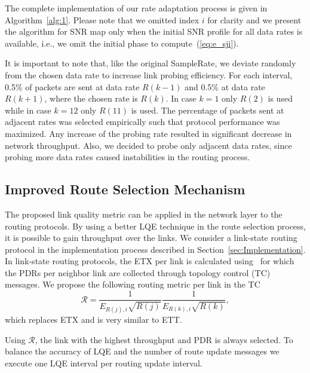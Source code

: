 \documentclass[11pt,draftclsnofoot,journal,onecolumn]{IEEEtran}
\begin{document}
The complete implementation of our rate adaptation process is given in Algorithm~\ref{alg:1}. Please note that we omitted index $i$ for clarity and we present the algorithm for SNR map only when the initial SNR profile for all data rates is available, i.e., we omit the initial phase to compute~(\ref{eq:e_sji}).

It is important to note that, like the original SampleRate, we deviate randomly from the chosen data rate to increase link probing efficiency. For each interval, 0.5\% of packets are sent at data rate $R(k-1)$ and 0.5\% at data rate $R(k+1)$, where the chosen rate is $R(k)$. In case $k=1$ only $R(2)$ is used while in case $k=12$ only $R(11)$ is used. The percentage of packets sent at adjacent rates was selected empirically such that protocol performance was maximized. Any increase of the probing rate resulted in significant decrease in network throughput. Also, we decided to probe only adjacent data rates, since probing more data rates caused instabilities in the routing process.

\subsection{Improved Route Selection Mechanism}
\label{sec:SNR_ROUTE}

The proposed link quality metric can be applied in the network layer to the routing protocols. By using a better LQE technique in the route selection process, it is possible to gain throughput over the links. We consider a link-state routing protocol in the implementation process described in Section~\ref{sec:Implementation}. In link-state routing protocols, the ETX per link is calculated using~\cite[Eq. 1]{Couto_WN_2005} for which the PDRs per neighbor link are collected through topology control (TC) messages. We propose the following routing metric per link in the TC
\begin{equation}
\mathcal R=\frac{1}{E_{R(j),i}\sqrt{R(j)}}\frac{1}{E_{R(k),i}\sqrt{R(k)}},
\label{eq:M}
\end{equation}
which replaces ETX and is very similar to ETT.

Using $\mathcal R$, the link with the highest throughput and PDR is always selected. To balance the accuracy of LQE and the number of route update messages we execute one LQE interval per routing update interval.
\end{document}
